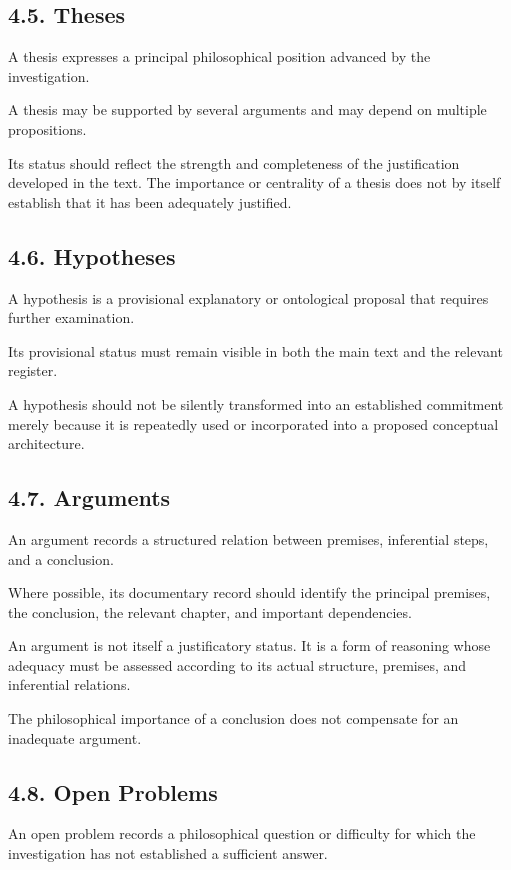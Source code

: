 \subsection*{4.5. Theses}

A thesis expresses a principal philosophical
position advanced by the investigation.

A thesis may be supported by several arguments
and may depend on multiple propositions.

Its status should reflect the strength and
completeness of the justification developed
in the text. The importance or centrality of
a thesis does not by itself establish that
it has been adequately justified.

\subsection*{4.6. Hypotheses}

A hypothesis is a provisional explanatory
or ontological proposal that requires further
examination.

Its provisional status must remain visible
in both the main text and the relevant register.

A hypothesis should not be silently transformed
into an established commitment merely because
it is repeatedly used or incorporated into
a proposed conceptual architecture.

\subsection*{4.7. Arguments}

An argument records a structured relation
between premises, inferential steps, and
a conclusion.

Where possible, its documentary record should
identify the principal premises, the conclusion,
the relevant chapter, and important dependencies.

An argument is not itself a justificatory
status. It is a form of reasoning whose
adequacy must be assessed according to its
actual structure, premises, and inferential
relations.

The philosophical importance of a conclusion
does not compensate for an inadequate argument.

\subsection*{4.8. Open Problems}

An open problem records a philosophical question
or difficulty for which the investigation has
not established a sufficient answer.

